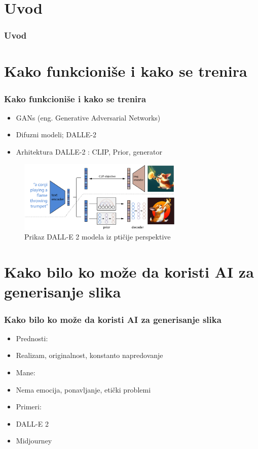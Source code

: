 \documentclass{beamer}
\begin{document}
\section{Uvod} %

\begin{frame}[fragile]\frametitle{Uvod}
	
\end{frame}

\section{Kako funkcioniše i kako se trenira}

\begin{frame}[fragile]\frametitle{Kako funkcioniše i kako se trenira}

\begin{itemize}
	\item GANs (eng. Generative Adversarial Networks)
	\item Difuzni modeli; DALLE-2
	\item Arhitektura DALLE-2 : CLIP, Prior, generator
\end{itemize}

\begin{figure}[htp]
\centering
\includegraphics[width=0.7\textwidth]{dalle2.eps}
\caption{Prikaz DALL-E 2 modela iz ptičije perspektive}
\label{fig: dalle2slika}
\end{figure}

\end{frame}

\section{Kako bilo ko može da koristi AI za generisanje slika}	%

\begin{frame}[fragile]\frametitle{Kako bilo ko može da koristi AI za generisanje slika}
    \begin{itemize}
		\item Prednosti:
        \item[] Realizam, originalnost, konstanto napredovanje
        \item Mane:
        \item[] Nema emocija, ponavljanje, etički problemi
        \item Primeri:
		\item[] DALL-E 2
		\item[] Midjourney
	\end{itemize}
	
\end{frame}
\end{document}
